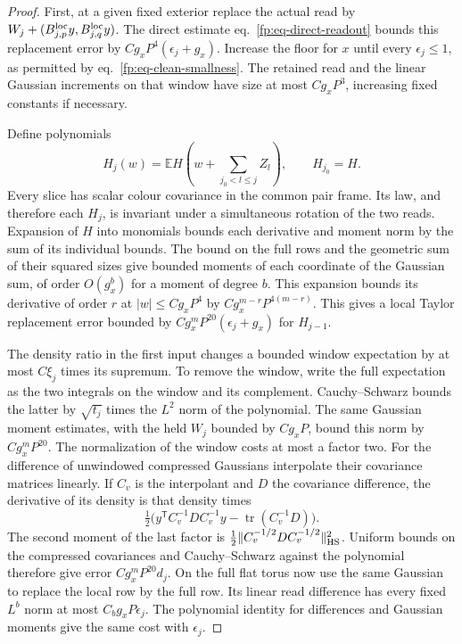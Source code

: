 \documentclass[11pt,letterpaper,reqno]{amsart}
\numberwithin{equation}{section}
\renewcommand{\eqref}[1]{\textup{eq.~\ref{#1}}}
\theoremstyle{definition}
\theoremstyle{remark}
\begin{document}
\begin{proof}
First, at a given fixed exterior replace the actual read by
$W_j+(B^{\rm loc}_{j,p}y,B^{\rm loc}_{j,q}y)$. The direct
estimate \eqref{fp:eq-direct-readout} bounds this replacement
error by \(Cg_x P^4(\epsilon_j+g_x)\). Increase the floor for
\(x\) until every \(\epsilon_j\le1\), as permitted by
\eqref{fp:eq-clean-smallness}. The retained read and the
linear Gaussian increments on that window have size at most
$Cg_xP^3$, increasing fixed constants if necessary.

Define polynomials
\[
 H_j(w)=\mathbb E H\left(w+\sum_{j_0<l\le j} Z_l\right),
 \qquad H_{j_0}=H .
\]
Every slice has scalar colour covariance in the common pair
frame. Its law, and therefore each \(H_j\), is invariant under
a simultaneous rotation of the two reads. Expansion of \(H\)
into monomials bounds each derivative and moment norm by the
sum of its individual bounds.
The bound on the full rows and the geometric sum of their
squared sizes give bounded moments of each coordinate of the
Gaussian sum, of order $O(g_x^b)$ for a moment of degree $b$.
This expansion bounds its derivative of order $r$
at $|w|\le Cg_xP^4$ by $C g_x^{m-r}P^{4(m-r)}$.
This gives a local Taylor replacement error bounded by
$C g_x^m P^{20}(\epsilon_j+g_x)$ for $H_{j-1}$.

The density ratio in the first input changes a bounded
window expectation by at most $C\xi_j$ times its supremum.
To remove the window, write the full expectation as the two
integrals on the window and its complement. Cauchy--Schwarz
bounds the latter by $\sqrt{t_j}$ times the $L^2$ norm of the
polynomial. The same Gaussian moment estimates, with the held
$W_j$ bounded by $Cg_xP$, bound this norm by $Cg_x^mP^{20}$.
The normalization of the window costs at most a factor two.
For the difference of unwindowed compressed Gaussians interpolate
their covariance matrices linearly. If $C_v$ is the interpolant
and $D$ the covariance difference, the derivative of its density
is that density times
\[
 \tfrac12\big(y^{\mathsf T}C_v^{-1}DC_v^{-1}y
                       -\operatorname{tr}(C_v^{-1}D)\big).
\]
The second moment of the last factor is
$\tfrac12\|C_v^{-1/2}DC_v^{-1/2}\|_{\rm HS}^2$.
Uniform bounds on the compressed covariances and
Cauchy--Schwarz against the polynomial therefore give error
$Cg_x^mP^{20}d_j$. On the full flat torus now use the same
Gaussian to replace the local row by the full row. Its linear
read difference has every fixed $L^b$ norm at most
$C_b g_xP\epsilon_j$. The polynomial identity for differences
and Gaussian moments give the same cost with $\epsilon_j$.


\end{proof}
\end{document}
